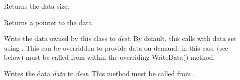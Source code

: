 \label{wxprivatedataobjectgetsize}


Returns the data size.

\label{wxprivatedataobjectgetdata}


Returns a pointer to the data.

\label{wxprivatedataobjectwritedata}


Write the data owned by this class to {\it dest}. By default, this
calls  with data 
set using .
This can be overridden to provide data on-demand; in this case
 (see below) must be called from
within the overriding WriteData() method.

\label{wxprivatedataobjectwritedata2}


Writes the data {\it data} to {\it dest}. This method must be called
from .

